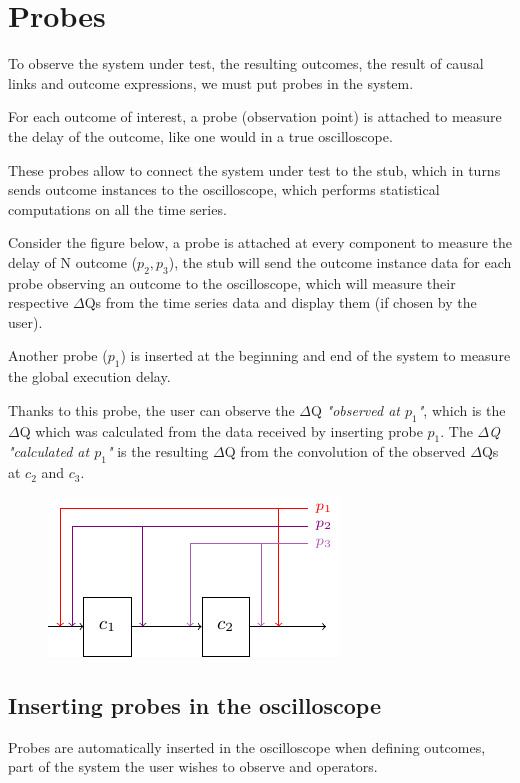 \section{Probes}

To observe the system under test, the resulting outcomes, the result of causal links and outcome expressions, we must put probes in the system. 

For each outcome of interest, a probe (observation point) is attached to measure the delay of the outcome, like one would in a true oscilloscope. 

These probes allow to connect the system under test to the stub, which in turns sends outcome instances to the oscilloscope, which performs statistical computations on all the time series. 

Consider the figure below, a probe is attached at every component to measure the delay of N outcome ($p_2, p_3$), the stub will send the outcome instance data for each probe observing an outcome to the oscilloscope, which will measure their respective $\Delta$Qs from the time series data and display them (if chosen by the user). 

Another probe ($p_1$) is inserted at the beginning and end of the system to measure the global execution delay. 

Thanks to this probe, the user can observe the $\Delta$Q \textit{"observed at $p_1$"}, which is the $\Delta$Q which was calculated from the data received by inserting probe $p_1$. The \textit{$\Delta$Q "calculated at $p_1$"} is the resulting $\Delta$Q from the convolution of the observed $\Delta$Qs at $c_2$ and $c_3$.   
    \begin{figure}[H]
        \begin{center}
            \includegraphics[scale=1.8]{tikz/probes.pdf}
        \end{center}
        \label{fig:probes}
    \end{figure}

    \subsection{Inserting probes in the oscilloscope}
        Probes are automatically inserted in the oscilloscope when defining outcomes, part of the system the user wishes to observe and operators. 
        
